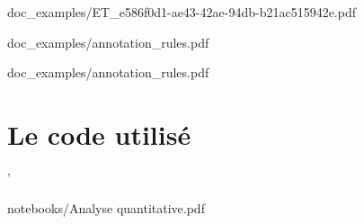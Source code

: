 \documentclass{report}
\begin{document}
        
                    {doc_examples/ET_e586f0d1-ae43-42ae-94db-b21ac515942e.pdf}

        
        {doc_examples/annotation_rules.pdf}
        
        {doc_examples/annotation_rules.pdf}

        


    \chapter{Le code utilisé}

'
        
                    {notebooks/Analyse quantitative.pdf}
\end{document}
